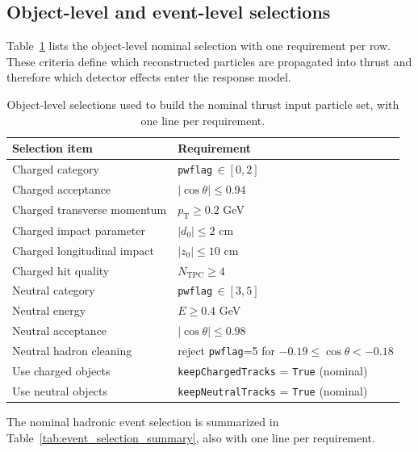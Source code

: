 \subsection{Object-level and event-level selections}

Table~\ref{tab:particle_selection_summary} lists the object-level nominal selection with one requirement per row. These criteria define which reconstructed particles are propagated into thrust and therefore which detector effects enter the response model.

\begin{table}[t!]
\centering
\begin{tabular}{@{}p{}p{}@{}}
\hline
Selection item & Requirement \\
\hline
Charged category & \texttt{pwflag}\,$\in[0,2]$ \\
Charged acceptance & $|\cos\theta|\le 0.94$ \\
Charged transverse momentum & $p_{\mathrm{T}}\ge 0.2$ GeV \\
Charged impact parameter & $|d_0|\le 2$ cm \\
Charged longitudinal impact & $|z_0|\le 10$ cm \\
Charged hit quality & $N_{\mathrm{TPC}}\ge 4$ \\
Neutral category & \texttt{pwflag}\,$\in[3,5]$ \\
Neutral energy & $E\ge 0.4$ GeV \\
Neutral acceptance & $|\cos\theta|\le 0.98$ \\
Neutral hadron cleaning & reject \texttt{pwflag}=5 for $-0.19\le\cos\theta<-0.18$ \\
Use charged objects & \texttt{keepChargedTracks} = \texttt{True} (nominal) \\
Use neutral objects & \texttt{keepNeutralTracks} = \texttt{True} (nominal) \\
\hline
\end{tabular}
\caption{Object-level selections used to build the nominal thrust input particle set, with one line per requirement.}
\label{tab:particle_selection_summary}
\end{table}

The nominal hadronic event selection is summarized in Table~\ref{tab:event_selection_summary}, also with one line per requirement.

